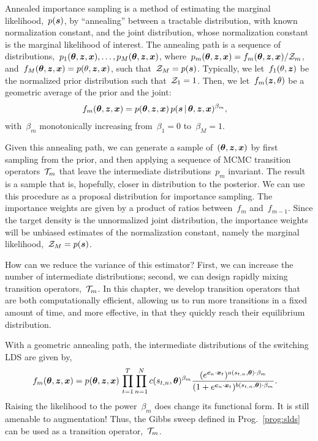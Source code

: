 Annealed importance sampling \citep{neal2001annealed} is a method of
estimating the marginal likelihood,~$p(\boldsymbol{s})$, by ``annealing'' between
a tractable distribution, with known normalization constant, and the
joint distribution, whose normalization constant is the marginal
likelihood of interest. The annealing path is a sequence of
distributions,~${p_1(\boldsymbol{\theta}, \boldsymbol{z}, \boldsymbol{x}), \ldots, p_M(\boldsymbol{\theta}, \boldsymbol{z}, \boldsymbol{x})}$,
where~${p_m(\boldsymbol{\theta}, \boldsymbol{z}, \boldsymbol{x})=f_m(\boldsymbol{\theta}, \boldsymbol{z}, \boldsymbol{x})/\mathcal{Z}_m}$,
and~${f_M(\boldsymbol{\theta}, \boldsymbol{z}, \boldsymbol{x}) =p(\theta, \boldsymbol{z}, \boldsymbol{x})}$, such that~${\mathcal{Z}_M=p(\boldsymbol{s})}$.
Typically, we let~$f_1(\theta, \boldsymbol{z})$ be the normalized prior
distribution such that~${\mathcal{Z}_1=1}$. Then, we let~$f_m(\boldsymbol{z}, \theta)$ be
a geometric average of the prior and the joint:
\begin{align*}
  f_m(\boldsymbol{\theta}, \boldsymbol{z}, \boldsymbol{x}) &= p(\boldsymbol{\theta}, \boldsymbol{z}, \boldsymbol{x}) \, p(\boldsymbol{s} \,|\, \boldsymbol{\theta}, \boldsymbol{z}, \boldsymbol{x})^{\beta_m},
\end{align*}
with~$\beta_m$ monotonically increasing from~${\beta_1=0}$ to~${\beta_M=1}$.

Given this annealing path, we can generate a sample
of~$(\boldsymbol{\theta}, \boldsymbol{z}, \boldsymbol{x})$ by first sampling from the prior, and then
applying a sequence of MCMC transition operators~$\mathcal{T}_m$ that leave
the intermediate distributions~$p_m$ invariant. The result is a sample
that is, hopefully, closer in distribution to the posterior. We can
use this procedure as a proposal distribution for importance sampling.
The importance weights are given by a product of ratios between~$f_m$
and~$f_{m-1}$.  Since the target density is the unnormalized joint
distribution, the importance weights will be unbiased estimates of the
normalization constant, namely the marginal
likelihood,~${\mathcal{Z}_M =p(\boldsymbol{s})}$.

How can we reduce the variance of this estimator? First, we can
increase the number of intermediate distributions; second, we can
design rapidly mixing transition operators,~$\mathcal{T}_m$. In this chapter,
we develop transition operators that are both computationally efficient,
allowing us to run more transitions in a fixed amount of time, and more
effective, in that they quickly reach their equilibrium distribution.

With a geometric annealing path, the intermediate distributions of the 
switching LDS are given by,
\begin{align}
  \label{eq:intermediate}
  f_m(\boldsymbol{\theta}, \boldsymbol{z}, \boldsymbol{x}) 
  &= p(\boldsymbol{\theta}, \boldsymbol{z}, \boldsymbol{x}) \,  
    \prod_{t=1}^T \prod_{n=1}^N
    c(s_{t,n}, \boldsymbol{\theta})^{\beta_m} \frac{(e^{\boldsymbol{c}_n \cdot \boldsymbol{x}_t})^{a(s_{t,n}, \boldsymbol{\theta}) \cdot \beta_m}}
    {(1+e^{\boldsymbol{c}_n \cdot \boldsymbol{x}_t})^{b(s_{t,n}, \boldsymbol{\theta}) \cdot \beta_m}}.
\end{align}
Raising the likelihood to the power~$\beta_m$ does change its
functional form. It is still amenable to \polyagamma augmentation!
Thus, the Gibbs sweep defined in Prog.~\ref{prog:slds} can be used as
a transition operator,~$\mathcal{T}_m$.

